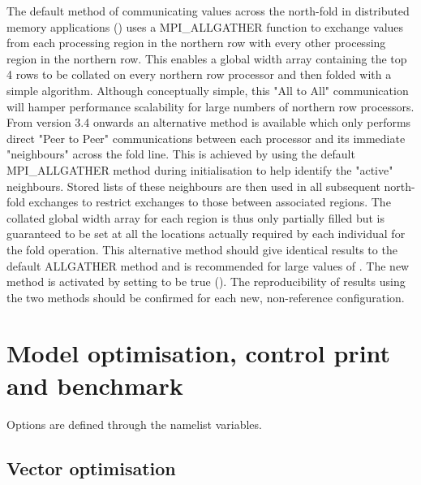 \documentclass[../main/NEMO_manual]{subfiles}
\begin{document}
The default method of communicating values across the north-fold in distributed memory applications ()
uses a \textsc{MPI\_ALLGATHER} function to exchange values from each processing region in
the northern row with every other processing region in the northern row.
This enables a global width array containing the top 4 rows to be collated on every northern row processor and then
folded with a simple algorithm.
Although conceptually simple, this "All to All" communication will hamper performance scalability for
large numbers of northern row processors.
From version 3.4 onwards an alternative method is available which only performs direct "Peer to Peer" communications
between each processor and its immediate "neighbours" across the fold line.
This is achieved by using the default \textsc{MPI\_ALLGATHER} method during initialisation to
help identify the "active" neighbours.
Stored lists of these neighbours are then used in all subsequent north-fold exchanges to
restrict exchanges to those between associated regions.
The collated global width array for each region is thus only partially filled but is guaranteed to
be set at all the locations actually required by each individual for the fold operation.
This alternative method should give identical results to the default \textsc{ALLGATHER} method and
is recommended for large values of .
The new method is activated by setting  to be true ().
The reproducibility of results using the two methods should be confirmed for each new,
non-reference configuration.

\section{Model optimisation, control print and benchmark}
\label{sec:MISC_opt}

\begin{listing}
  \caption{}
  \label{lst:namctl}
\end{listing}

Options are defined through the   namelist variables.

\subsection{Vector optimisation}
\end{document}
